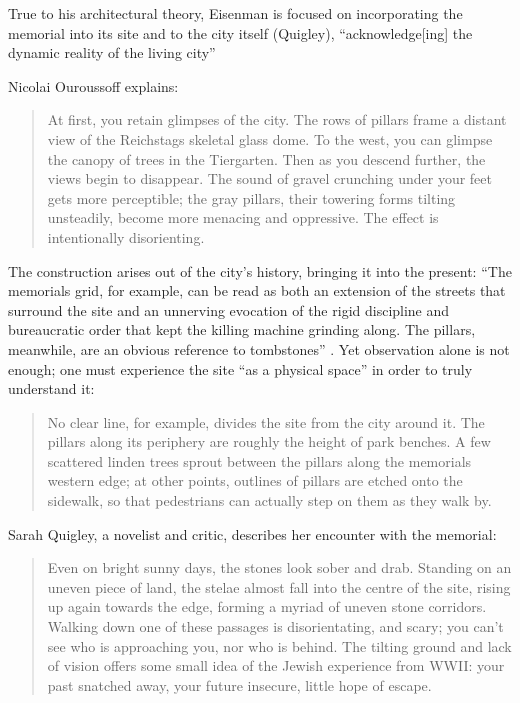 True to his architectural theory, Eisenman is focused on
incorporating the memorial into its site and to the city itself
(Quigley), “acknowledge[ing] the dynamic reality of the living city” \citep[][pp.~207]{eisenman2004}

Nicolai Ouroussoff explains: 


\begin{quote}
At first, you retain glimpses of the city.  The rows
of pillars frame a distant view of the Reichstag{\textquotesingle}s
skeletal glass dome.  To the west, you can glimpse the canopy of trees
in the Tiergarten.  Then as you descend further, the views begin to
disappear.  The sound of gravel crunching under your feet gets more
perceptible; the gray pillars, their towering forms tilting unsteadily,
become more menacing and oppressive.  The effect is intentionally
disorienting. \citep{ouroussoff2005}
\end{quote}

The construction arises out of the city’s history,
bringing it into the present: “The memorial{\textquotesingle}s grid,
for example, can be read as both an extension of the streets that
surround the site and an unnerving evocation of the rigid discipline
and bureaucratic order that kept the killing machine grinding along. 
The pillars, meanwhile, are an obvious reference to tombstones” \citep{ouroussoff2005}.  
Yet observation alone is not enough; one must
experience the site “as a physical space” in order to truly understand
it: 

\begin{quote}
No clear line, for example, divides the site from the
city around it.  The pillars along its periphery are roughly the height
of park benches.  A few scattered linden trees sprout between the
pillars along the memorial{\textquotesingle}s western edge; at other
points, outlines of pillars are etched onto the sidewalk, so that
pedestrians can actually step on them as they walk by. \citep{ouroussoff2005}
\end{quote}

Sarah Quigley, a novelist and critic, describes her encounter with the
memorial: 

\begin{quote}
Even on bright sunny days, the
stones look sober and drab.  Standing on an uneven piece of land, the
stelae almost fall into the centre of the site, rising up again towards
the edge, forming a myriad of uneven stone corridors.  Walking down one
of these passages is disorientating, and scary; you can’t see who is
approaching you, nor who is behind.  The tilting ground and lack of
vision offers some small idea of the Jewish experience from WWII: your
past snatched away, your future insecure, little hope of escape. \citep{quigley2005}
\end{quote}

